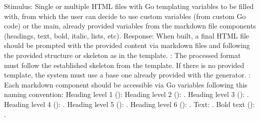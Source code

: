 {}\markdownRendererInterblockSeparator
{}Stimulus: Single or multiple HTML files with Go templating variables to be filled with, from which the user can decide to use custom variables (from custom Go code) or the main, already provided variables from the markdown file components (headings, text, bold, italic, lists, etc).\markdownRendererInterblockSeparator
{}Response: When built, a final HTML file should be prompted with the provided content via markdown files and following the provided structure or skeleton as in the template.\markdownRendererInterblockSeparator
{}\markdownRendererInterblockSeparator
{}: The processed format must follow the established skeleton from the template. If there is no provided template, the system must use a base one already provided with the generator.\markdownRendererInterblockSeparator
{}: Each markdown component should be accessible via Go variables following this naming convention:\markdownRendererInterblockSeparator
{}\markdownRendererUlBeginTight
\markdownRendererUlItem Heading level 1 (\markdownRendererCodeSpan{\markdownRendererHash{}}): \markdownRendererUlItemEnd 
\markdownRendererUlItem Heading level 2 (\markdownRendererCodeSpan{\markdownRendererHash{}\markdownRendererHash{}}): .\markdownRendererUlItemEnd 
\markdownRendererUlItem Heading level 3 (\markdownRendererCodeSpan{\markdownRendererHash{}\markdownRendererHash{}\markdownRendererHash{}}): .\markdownRendererUlItemEnd 
\markdownRendererUlItem Heading level 4 (\markdownRendererCodeSpan{\markdownRendererHash{}\markdownRendererHash{}\markdownRendererHash{}\markdownRendererHash{}}): .\markdownRendererUlItemEnd 
\markdownRendererUlItem Heading level 5 (\markdownRendererCodeSpan{\markdownRendererHash{}\markdownRendererHash{}\markdownRendererHash{}\markdownRendererHash{}\markdownRendererHash{}}): .\markdownRendererUlItemEnd 
\markdownRendererUlItem Heading level 6 (\markdownRendererCodeSpan{\markdownRendererHash{}\markdownRendererHash{}\markdownRendererHash{}\markdownRendererHash{}\markdownRendererHash{}\markdownRendererHash{}}): .\markdownRendererUlItemEnd 
\markdownRendererUlItem Text: .\markdownRendererUlItemEnd 
\markdownRendererUlItem Bold text (): .\markdownRendererUlItemEnd 
